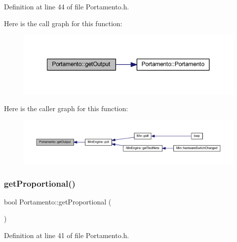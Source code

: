 Definition at line 44 of file Portamento.\+h.

Here is the call graph for this function\+:
\nopagebreak
\begin{figure}[H]
\begin{center}
\leavevmode
\includegraphics[width=350pt]{class_portamento_ac9c42e58272962a5a7f7d0300ba2e595_cgraph}
\end{center}
\end{figure}
Here is the caller graph for this function\+:
\nopagebreak
\begin{figure}[H]
\begin{center}
\leavevmode
\includegraphics[width=350pt]{class_portamento_ac9c42e58272962a5a7f7d0300ba2e595_icgraph}
\end{center}
\end{figure}
\mbox{\label{class_portamento_a2cc6e550905558daac49cbef693c62fb}} 
\subsubsection{\texorpdfstring{get\+Proportional()}{getProportional()}}
{\footnotesize\ttfamily bool Portamento\+::get\+Proportional (\begin{DoxyParamCaption}{ }\end{DoxyParamCaption})\hspace{0.3cm}{\ttfamily [inline]}}



Definition at line 41 of file Portamento.\+h.

